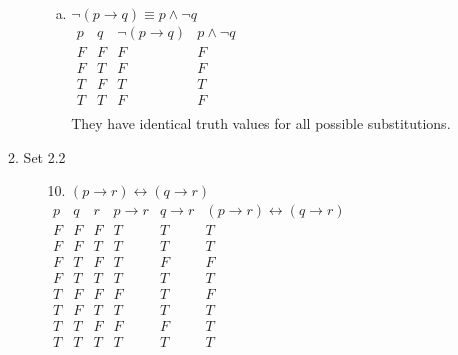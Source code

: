 \documentclass[letterpaper]{article}
\begin{document}
\begin{enumerate}
\begin{enumerate}
\begin{itemize}
\begin{enumerate}[(a)]
					\item
					$\neg \left( p \rightarrow q \right) \equiv p \wedge \neg q$ \\ $\begin{array}{c|c|c|c}
						p & q & \neg \left( p \rightarrow q \right) & p \wedge \neg q \\ \hline
						F & F & F & F \\ \hline
						F & T & F & F \\ \hline
						T & F & T & T \\ \hline
						T & T & F & F \\
					\end{array}$ \\
					They have identical truth values for all possible substitutions.
				\end{enumerate}				
			\end{itemize}
		
			\item Set 2.2
			\begin{itemize}
				\item [10.]
				$\left( p \rightarrow r \right) \leftrightarrow \left( q \rightarrow r \right)$ \\
				$\begin{array}{c|c|c|c|c|c}
					p & q & r & p \rightarrow r & q \rightarrow r & \left( p \rightarrow r \right) \leftrightarrow \left( q \rightarrow r \right) \\ \hline
					F & F & F & T & T & T \\ \hline
					F & F & T & T & T & T \\ \hline
					F & T & F & T & F & F \\ \hline
					F & T & T & T & T & T \\ \hline
					T & F & F & F & T & F \\ \hline
					T & F & T & T & T & T \\ \hline
					T & T & F & F & F & T \\ \hline
					T & T & T & T & T & T \\ 
				\end{array}$
				

\end{itemize}
\end{enumerate}
\end{enumerate}
\end{document}
